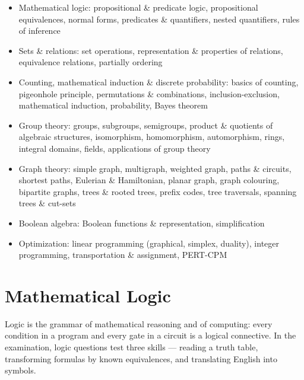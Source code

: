 

\begin{sylbox}

\begin{itemize}
\tightlist
\item[$\square$]
  Mathematical logic: propositional \& predicate logic, propositional equivalences, normal forms, predicates \& quantifiers, nested quantifiers, rules of inference
\item[$\square$]
  Sets \& relations: set operations, representation \& properties of relations, equivalence relations, partially ordering
\item[$\square$]
  Counting, mathematical induction \& discrete probability: basics of counting, pigeonhole principle, permutations \& combinations, inclusion-exclusion, mathematical induction, probability, Bayes\textquotesingle{} theorem
\item[$\square$]
  Group theory: groups, subgroups, semigroups, product \& quotients of algebraic structures, isomorphism, homomorphism, automorphism, rings, integral domains, fields, applications of group theory
\item[$\square$]
  Graph theory: simple graph, multigraph, weighted graph, paths \& circuits, shortest paths, Eulerian \& Hamiltonian, planar graph, graph colouring, bipartite graphs, trees \& rooted trees, prefix codes, tree traversals, spanning trees \& cut-sets
\item[$\square$]
  Boolean algebra: Boolean functions \& representation, simplification
\item[$\square$]
  Optimization: linear programming (graphical, simplex, duality), integer programming, transportation \& assignment, PERT-CPM
\end{itemize}

\end{sylbox}

\needspace{226pt}

\hypertarget{p2-01--1-mathematical-logic}{%
\section{Mathematical Logic}\label{p2-01--1-mathematical-logic}}

Logic is the grammar of mathematical reasoning and of computing: every condition in a program and every
gate in a circuit is a logical connective. In the examination, logic questions test three skills --- reading
a truth table, transforming formulas by known equivalences, and translating English into symbols.

